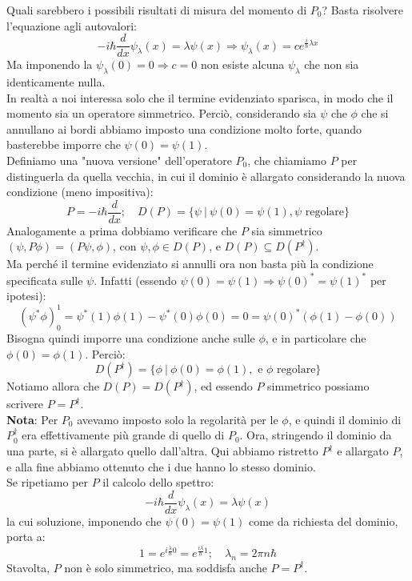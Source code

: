 Quali sarebbero i possibili risultati di misura del momento di $P_0$? Basta risolvere l'equazione agli autovalori:
\[
-i\hbar\frac{d}{dx}\psi_\lambda\left(x\right)=\lambda\psi\left(x\right)\Rightarrow \psi_\lambda\left(x\right)=c e^{\frac{i}{\hbar}\lambda x}
\]
Ma imponendo la $\psi_\lambda\left(0\right)=0\Rightarrow c=0$ non esiste alcuna $\psi_\lambda$ che non sia identicamente nulla.\\
In realtà a noi interessa solo che il termine evidenziato sparisca, in modo che il momento sia un operatore simmetrico. Perciò, considerando sia $\psi$ che $\phi$ che si annullano ai bordi abbiamo imposto una condizione molto forte, quando basterebbe imporre che $\psi(0) = \psi(1)$.\\
Definiamo una "nuova versione" dell'operatore $P_0$, che chiamiamo $P$ per distinguerla da quella vecchia, in cui il dominio è allargato considerando la nuova condizione (meno impositiva):
\[
P=-i\hbar\frac{d}{dx}; \quad D(P) = \{\psi\>|\> \psi(0) = \psi(1), \psi \text{ regolare}\}
\] %
Analogamente a prima dobbiamo verificare che $P$ sia simmetrico $\left(\psi, P\phi\right)=(P\psi,\phi)$, con $\psi, \phi \in D(P)$, e $D(P)\subseteq D(P^\dag)$.\\
Ma perché il termine evidenziato si annulli ora non basta più la condizione specificata sulle $\psi$. Infatti (essendo $\psi(0) = \psi(1) \Rightarrow \psi(0)^* = \psi(1)^*$ per ipotesi):
\[
(\psi^* \phi)_0^1 = \psi^*(1)\phi(1) - \psi^*(0)\phi(0) = 0 = \psi(0)^*(\phi(1)-\phi(0))
\]
Bisogna quindi imporre una condizione anche sulle $\phi$, e in particolare che $\phi\left(0\right)= \phi\left(1\right)$. Perciò:
\[
D(P^\dag) = \{ \phi \>|\> \phi(0) = \phi(1), \text{ e $\phi$ regolare}\}
\]
Notiamo allora che $D(P) = D(P^\dag)$, ed essendo $P$ simmetrico possiamo scrivere $P=P^\dag$.\\
\textbf{Nota}: Per $P_0$ avevamo imposto solo la regolarità per le $\phi$, e quindi il dominio di $P_0^\dag$ era effettivamente più grande di quello di $P_0$. Ora, stringendo il dominio da una parte, si è allargato quello dall'altra. Qui abbiamo ristretto $P^\dag$ e allargato $P$, e alla fine abbiamo ottenuto che i due hanno lo stesso dominio.\\
Se ripetiamo per $P$ il calcolo dello spettro:
\[
-i\hbar\frac{d}{dx}\psi_\lambda\left(x\right)=\lambda\psi\left(x\right)
\]
la cui soluzione, imponendo che $\psi\left(0\right)=\psi\left(1\right)$ come da richiesta del dominio, porta a:
\[
1=e^{i\frac{\lambda}{\hbar}0}=e^{\frac{i\lambda}{\hbar}1};\quad \lambda_n=2\pi n\hbar
\]
Stavolta, $P$ non è solo simmetrico, ma soddisfa anche $P=P^\dag$.


